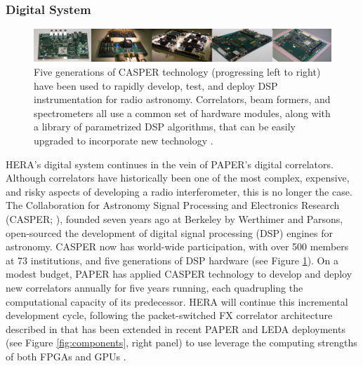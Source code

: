 \documentclass[preprint]{aastex}
\begin{document}
%



\subsubsection{Digital System}

\begin{figure}[!ht]\centering
\includegraphics[width=6.5in]{plots/casper_boards.jpg}
\caption{\small
Five generations of CASPER technology (progressing left to right) have been used to rapidly
develop, test, and deploy DSP instrumentation for radio astronomy.  Correlators,
beam formers, and spectrometers all use a common set of hardware modules, along with a library
of parametrized DSP algorithms, that can be easily upgraded to incorporate new technology
\citep{parsons_et_al2006,parsons_et_al2008}.
}\label{fig:casper_boards}
\end{figure}

HERA's digital system continues in the vein of PAPER's digital correlators.
Although correlators have historically been one of the most complex,
expensive, and risky aspects of developing a radio interferometer, this is no longer the case.
The Collaboration for Astronomy Signal Processing and Electronics Research
(CASPER; \citealt{parsons_et_al2006}), founded seven years ago at Berkeley
by Werthimer and Parsons, open-sourced the development of digital signal processing (DSP) engines for astronomy.
CASPER now has world-wide participation,
with over 500 members at 73 institutions, and 
five generations of DSP hardware (see Figure \ref{fig:casper_boards}). 
On a modest budget, PAPER has applied CASPER technology to develop and deploy new correlators
annually for five years running, each quadrupling the computational capacity of its predecessor.
HERA will continue this incremental development cycle, following the packet-switched
FX correlator architecture described in \citet{parsons_et_al2008} that has been
extended in recent PAPER and LEDA deployments (see Figure \ref{fig:components}, right panel)
to use leverage the computing strengths of both FPGAs and GPUs \citep{clark_et_al2011}.
\end{document}
